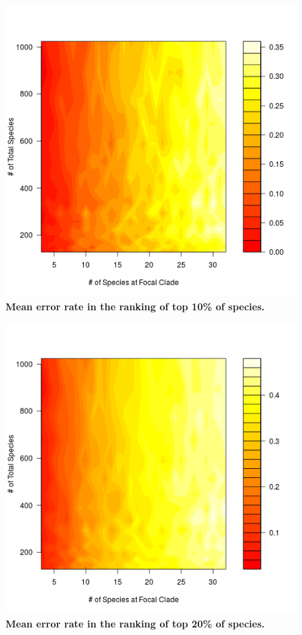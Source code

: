 \documentclass[12pt,english]{article}
\begin{document}
\begin{figure}[!ht]
  \center
  \includegraphics[width=.5\textwidth]{errorRate10pct.png}
  \caption{\textbf{Mean error rate in the ranking of top 10\% of species.} }
\end{figure}

\begin{figure}[!ht]
  \center
  \includegraphics[width=.5\textwidth]{errorRate20pct.png}
  \caption{\textbf{Mean error rate in the ranking of top 20\% of species.}}
\end{figure}
\end{document}
